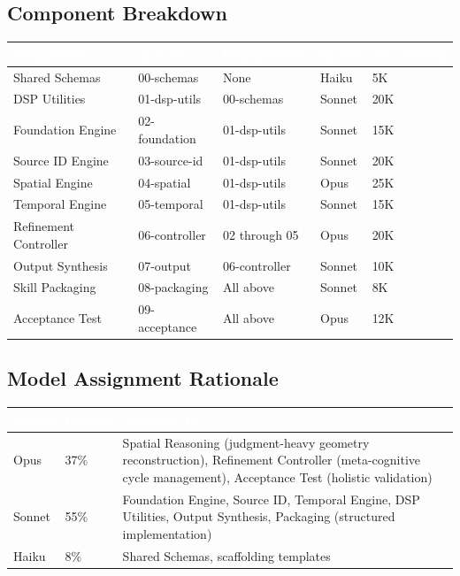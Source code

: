 \documentclass[11pt,letterpaper]{article}
\newcommand{\tableheader}[1]{\textbf{\sffamily\textcolor{white}{#1}}}
\begin{document}
\subsection{Component Breakdown}

\begin{center}
\begin{tabularx}{\textwidth}{L{3cm}L{2cm}L{2cm}C{1.5cm}C{1.5cm}}
\toprule
{}
\tableheader{Component} & \tableheader{Spec Doc} & \tableheader{Dependencies} & \tableheader{Model} & \tableheader{Est.\ Tokens} \\
\midrule
Shared Schemas & 00-schemas & None & Haiku & 5K \\
DSP Utilities & 01-dsp-utils & 00-schemas & Sonnet & 20K \\
Foundation Engine & 02-foundation & 01-dsp-utils & Sonnet & 15K \\
Source ID Engine & 03-source-id & 01-dsp-utils & Sonnet & 20K \\
Spatial Engine & 04-spatial & 01-dsp-utils & Opus & 25K \\
Temporal Engine & 05-temporal & 01-dsp-utils & Sonnet & 15K \\
Refinement Controller & 06-controller & 02 through 05 & Opus & 20K \\
Output Synthesis & 07-output & 06-controller & Sonnet & 10K \\
Skill Packaging & 08-packaging & All above & Sonnet & 8K \\
Acceptance Test & 09-acceptance & All above & Opus & 12K \\
\bottomrule
\end{tabularx}
\end{center}

\subsection{Model Assignment Rationale}

\begin{center}
\begin{tabularx}{\textwidth}{C{1.5cm}C{1.5cm}X}
\toprule
{}
\tableheader{Model} & \tableheader{Budget} & \tableheader{Assigned To} \\
\midrule
Opus & 37\% & Spatial Reasoning (judgment-heavy geometry reconstruction), Refinement Controller (meta-cognitive cycle management), Acceptance Test (holistic validation) \\
Sonnet & 55\% & Foundation Engine, Source ID, Temporal Engine, DSP Utilities, Output Synthesis, Packaging (structured implementation) \\
Haiku & 8\% & Shared Schemas, scaffolding templates \\
\bottomrule
\end{tabularx}
\end{center}
\end{document}
